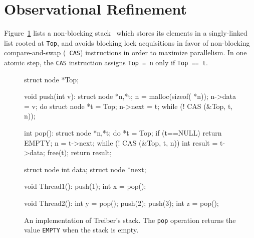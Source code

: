 
\section{Observational Refinement}
\label{sec:refinement}


Figure~\ref{fig:treiber} lists a non-blocking stack~\cite{tr/Treiber86} which
stores its elements in a singly-linked list rooted at {\tt Top}, and avoids
blocking lock acquisitions in favor of non-blocking compare-and-swap ({\tt
CAS}) instructions in order to maximize parallelism. In one atomic step, the
{\tt CAS} instruction assigns {\tt Top = n} only if {\tt Top == t}.

\begin{figure}[t]
  \scriptsize
  \begin{minipage}[t]{41mm}
    \begin{program}
struct node *Top;      
      
void push(int v):
  struct node *n,*t;
  n = malloc(sizeof( *n));
  n->data = v;
  do {
    struct node *t = Top;
    n->next = t;
  } while (! CAS (&Top, t, n));
    \end{program}
  \end{minipage}
  \begin{minipage}[t]{40mm}
    \begin{program}
int pop():
  struct node *n,*t;
  do {
    *t = Top;
    if (t==NULL) return EMPTY;
    n = t->next;
  } while (! CAS (&Top, t, n))
  int result = t->data;
  free(t);
  return result;
    \end{program}
  \end{minipage}
  \begin{minipage}[t]{30mm}
    \begin{program}
struct node {
  int data;
  struct node *next;
}
    \end{program}
  \end{minipage}
  \begin{minipage}[t]{25mm}
    \begin{program}
void Thread1():
  push(1);
  int x = pop();
    \end{program}
  \end{minipage}
  \begin{minipage}[t]{25mm}
    \begin{program}
void Thread2():
  int y = pop();
  push(2);
  push(3);
  int z = pop();
    \end{program}
  \end{minipage}
  \caption{An implementation of Treiber's stack. The {\tt pop} operation
  returns the value {\tt EMPTY} when the stack is empty.}
  \label{fig:treiber}
\end{figure}


